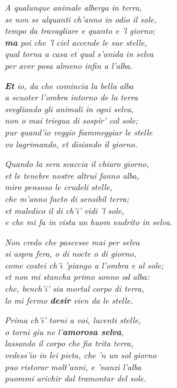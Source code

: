 \documentclass[a4paper]{article}
\begin{document}
\begin{center}
    \textit{A qualunque animale alberga in terra,} \\
    \textit{se non se alquanti ch'anno in odio il sole,} \\
    \textit{tempo da travagliare e quanto e 'l giorno;} \\
    \textit{\textbf{ma} poi che 'l ciel accende le sue stelle,} \\
    \textit{qual torna a casa et qual s'anida in selva} \\
    \textit{per aver posa almeno infin a l'alba.}
\end{center}
\begin{center}
    \textit{\textbf{Et} io, da che comincia la bella alba} \\
    \textit{a scuoter l'ombra intorno de la terra} \\
    \textit{svegliando gli animali in ogni selva,} \\
    \textit{non o mai triegua di sospir' col sole;} \\
    \textit{pur quand'io veggio fiammeggiar le stelle} \\
    \textit{vo lagrimando, et disiando il giorno.}
\end{center}
\begin{center}
    \textit{Quando la sera scaccia il chiaro giorno,} \\
    \textit{et le tenebre nostre altrui fanno alba,} \\
    \textit{miro pensoso le crudeli stelle,} \\
    \textit{che m'anno facto di sensibil terra;} \\
    \textit{et maledico il di ch'i' vidi 'l sole,} \\
    \textit{e che mi fa in vista un huom nudrito in selva.}
\end{center}
\begin{center}
    \textit{Non credo che pascesse mai per selva} \\
    \textit{si aspra fera, o di nocte o di giorno,} \\
    \textit{come costei ch'i 'piango a l'ombra e al sole;} \\
    \textit{et non mi stancha primo sonno od alba:} \\
    \textit{che, bench'i' sia mortal corpo di terra,} \\
    \textit{lo mi fermo \textbf{desir} vien da le stelle.}
\end{center}
\begin{center}
    \textit{Prima ch'i' torni a voi, lucenti stelle,} \\
    \textit{o torni giu ne l'\textbf{amorosa selva},} \\
    \textit{lassando il corpo che fia trita terra,} \\
    \textit{vedess'io in lei pieta, che 'n un sol giorno} \\
    \textit{puo ristorar molt'anni, e 'nanzi l'alba} \\
    \textit{puommi arichir dal tramontar del sole.}
\end{center}
\end{document}

